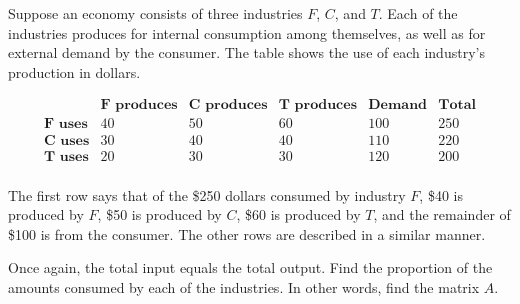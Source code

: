 \begin{example} \label{example_leontief_table}
    Suppose an economy consists of three industries \( F \), \( C \), and \( T \). Each of the industries produces for internal consumption among themselves, as well as for external demand by the consumer. The table shows the use of each industry's production in dollars.

    \[
        \begin{array}{cccccc}
            \textbf{ }      & \textbf{F produces} & \textbf{C produces} & \textbf{T produces} & \textbf{Demand} & \textbf{Total} \\
            \textbf{F uses} & 40                  & 50                  & 60                  & 100             & 250            \\
            \textbf{C uses} & 30                  & 40                  & 40                  & 110             & 220            \\
            \textbf{T uses} & 20                  & 30                  & 30                  & 120             & 200            \\
        \end{array}
    \]

    The first row says that of the \$250 dollars consumed by industry \( F \), \$40 is produced by \( F \), \$50 is produced by \( C \), \$60 is produced by \( T \), and the remainder of \$100 is from the consumer. The other rows are described in a similar manner.

    Once again, the total input equals the total output. Find the proportion of the amounts consumed by each of the industries. In other words, find the matrix \( A \).
\end{example}

